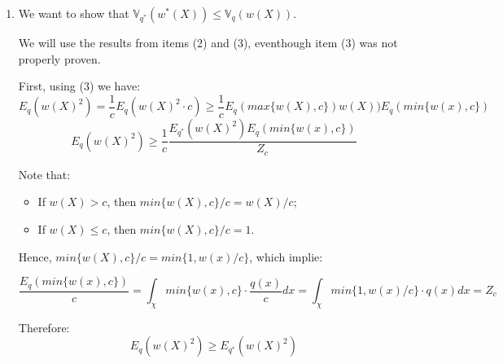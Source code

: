 \documentclass[12pt,letterpaper]{article}
\begin{document}
\begin{enumerate}[leftmargin=!,labelindent=5pt]
	\item 
	We want to show that
	$\mathbb V_{q^*} (w^*(X)) \leq \mathbb V_q(w(X))$.

	We will use the results from items (2) and (3), eventhough
	item (3) was not properly proven.

	First, using (3) we have:
	$$ E_q(w(X)^2) = \frac{1}{c}E_q(w(X)^2\cdot c)
	\geq \frac{1}{c}E_{q}(max\{ w(X), c\})w(X))E_q(min\{w(x),c\})$$
	$$ E_q(w(X)^2) \geq
	\frac{1}{c} \frac{E_{q^*}(w(X)^2)E_q(min\{w(x),c\})}{Z_c}$$

	Note that:
	\begin{itemize}
		\item If $w(X) > c$, then $min\{w(X),c\}/c = w(X)/c$;
		\item If $w(X) \leq c$, then $min\{w(X),c\}/c = 1$.
	\end{itemize}
	Hence, $min\{w(X),c\}/c = min\{1,w(x)/c\}$, which implie:

	$$ \frac{E_q(min\{w(x),c\})}{c} =
	\int_\chi min\{w(x),c\} \cdot \frac{q(x)}{c}dx = 
	\int_\chi min\{1,w(x)/c\} \cdot q(x)dx = Z_c
	$$

	Therefore:
	$$ E_q(w(X)^2) \geq
	E_{q^*}(w(X)^2)$$

\end{enumerate}

\newpage
\end{document}
